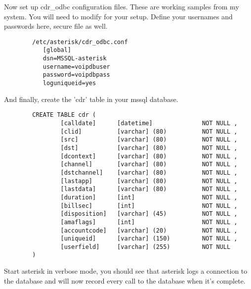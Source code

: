		Now set up cdr_odbc configuration files.  These are working samples
		from my system.  You will need to modify for your setup. Define
		your usernames and passwords here, secure file as well.
\begin{astlisting}
\begin{verbatim}
		/etc/asterisk/cdr_odbc.conf
		   [global]
		   dsn=MSSQL-asterisk
		   username=voipdbuser
		   password=voipdbpass
		   loguniqueid=yes
\end{verbatim}
\end{astlisting}
		And finally, create the 'cdr' table in your mssql database.
\begin{astlisting}
\begin{verbatim}
		CREATE TABLE cdr (
		        [calldate]      [datetime]              NOT NULL ,
		        [clid]          [varchar] (80)          NOT NULL ,
		        [src]           [varchar] (80)          NOT NULL ,
		        [dst]           [varchar] (80)          NOT NULL ,
		        [dcontext]      [varchar] (80)          NOT NULL ,
		        [channel]       [varchar] (80)          NOT NULL ,
		        [dstchannel]    [varchar] (80)          NOT NULL ,
		        [lastapp]       [varchar] (80)          NOT NULL ,
		        [lastdata]      [varchar] (80)          NOT NULL ,
		        [duration]      [int]                   NOT NULL ,
		        [billsec]       [int]                   NOT NULL ,
		        [disposition]   [varchar] (45)          NOT NULL ,
		        [amaflags]      [int]                   NOT NULL ,
		        [accountcode]   [varchar] (20)          NOT NULL ,
		        [uniqueid]      [varchar] (150)         NOT NULL ,
		        [userfield]     [varchar] (255)         NOT NULL
		)
\end{verbatim}
\end{astlisting}
		Start asterisk in verbose mode, you should see that asterisk
		logs a connection to the database and will now record every
		call to the database when it's complete.

